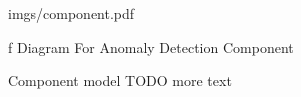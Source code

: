 

\medskip
{}
\picw=14cm \cinspic imgs/component.pdf
\caption/f Diagram For Anomaly Detection Component
\medskip

\sec Component model
TODO more text


